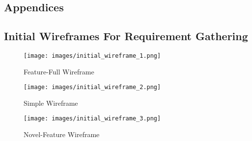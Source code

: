 \begin{appendices}

    \chapter{Appendices}

    \section{Initial Wireframes For Requirement Gathering}
    \label{app:initial_wireframes}

    \begin{figure}
        \centering
        \texttt{[image: images/initial\_wireframe\_1.png]}

        \caption{Feature-Full Wireframe}

        \label{fig:intial_wireframe_1}
    \end{figure}


    \begin{figure}
        \centering
        \texttt{[image: images/initial\_wireframe\_2.png]}

        \caption{Simple Wireframe}

        \label{fig:intial_wireframe_2}
    \end{figure}


    \begin{figure}
        \centering
        \texttt{[image: images/initial\_wireframe\_3.png]}

        \caption{Novel-Feature Wireframe}

        \label{fig:intial_wireframe_3}
    \end{figure}








    \end{appendices}
